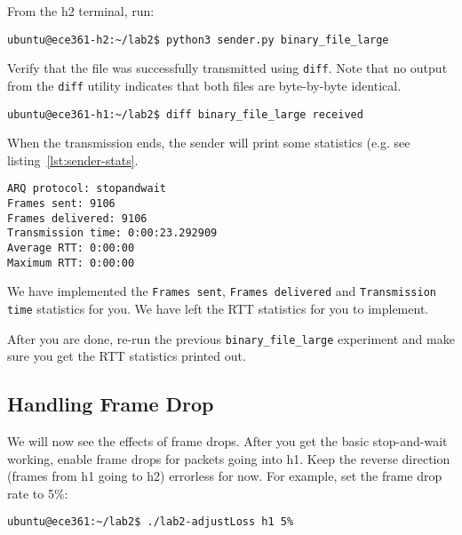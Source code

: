 \documentclass[11pt]{article}
\begin{document}
From the h2 terminal, run:
\begin{lstlisting}[style=ece361-shell-base, caption={}]
ubuntu@ece361-h2:~/lab2$ python3 sender.py binary_file_large
\end{lstlisting}

Verify that the file was successfully transmitted using \texttt{diff}.
Note that no output from the \texttt{diff} utility indicates that both files are byte-by-byte identical.
\begin{lstlisting}[style=ece361-shell-base, caption={}]
ubuntu@ece361-h1:~/lab2$ diff binary_file_large received
\end{lstlisting}

When the transmission ends, the sender will print some statistics (e.g. see listing~\ref{lst:sender-stats}.
\begin{lstlisting}[style=ece361-shell-base, caption={Example of sender statistics}, label={lst:sender-stats}]
ARQ protocol: stopandwait
Frames sent: 9106
Frames delivered: 9106
Transmission time: 0:00:23.292909
Average RTT: 0:00:00
Maximum RTT: 0:00:00
\end{lstlisting}

We have implemented the \texttt{Frames sent}, \texttt{Frames delivered} and \texttt{Transmission time} statistics for you.
We have left the RTT statistics for you to implement.

After you are done, re-run the previous \texttt{binary\_file\_large} experiment and make sure you get the RTT statistics printed out.


\subsection{Handling Frame Drop}
We will now see the effects of frame drops. After you get the basic stop-and-wait working, enable frame drops for packets going into h1.
Keep the reverse direction (frames from h1 going to h2) errorless for now.
For example, set the frame drop rate to 5\%:
\begin{lstlisting}[style=ece361-shell-base, caption={}]
ubuntu@ece361:~/lab2$ ./lab2-adjustLoss h1 5%
\end{lstlisting}
\end{document}
